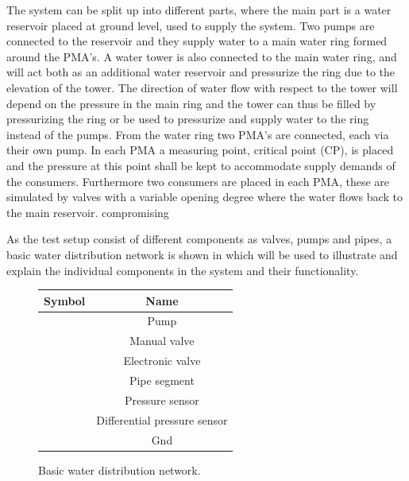 The system can be split up into different parts, where the main part is a water reservoir placed at ground level, used to supply the system. Two pumps are connected to the reservoir and they supply water to a main water ring formed around the PMA's. 
A water tower is also connected to the main water ring, and will act both as an additional water reservoir and pressurize the ring due to the elevation of the tower. The direction of water flow with respect to the tower will depend on the pressure in the main ring and the tower can thus be filled by pressurizing the ring or be used to pressurize and supply water to the ring instead of the pumps.  
From the water ring two PMA's are connected, each via their own pump. In each PMA a measuring point, critical point (CP), is placed and the pressure at this point shall be kept to accommodate supply demands of the consumers. Furthermore two consumers are placed in each PMA, these are simulated by valves with a variable opening degree where the water flows back to the main reservoir.   compromising       


As the test setup consist of different components as valves, pumps and pipes, a basic water distribution network is shown in  which will be used to illustrate and explain the individual components in the system and their functionality.   
	
\begin{figure}[H]
	\centering
	\begin{minipage}[b]{0.45\textwidth}
		\centering
		 
		\caption{Basic water distribution network.}
		\label{fig:Basic_example_sys}
	\end{minipage}
	\hspace{15pt}
	\begin{minipage}[b]{0.45\textwidth}
		\begin{tabular}{|c|c|} \hline
  			\bfseries Symbol 	 					&   \bfseries Name 					\\ \hline
			 		  	&	Pump							\\ \hline
			 	&	Manual valve					\\ \hline
			 		&	Electronic valve				\\ \hline
			 		  	&	Pipe segment					\\ \hline
			 &	Pressure sensor					\\ \hline
			 	&	Differential pressure sensor	\\ \hline
			 		  	&	Gnd								\\ \hline
		\end{tabular}
		\label{tab:sys_comp_overview}
	\end{minipage}
\end{figure}

